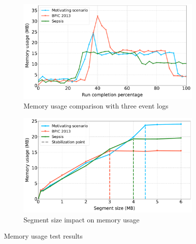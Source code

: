 \begin{figure}[t]
\begin{subfigure}{0.49\textwidth}   
  \centering      
  \includegraphics[width=\textwidth]{content/figures/memoryusage3-2.pdf}
  \caption{Memory usage comparison with three event logs}
  \label{snr_c}
\end{subfigure}
\begin{subfigure}{0.49\textwidth}   
  \centering
  \includegraphics[width=\textwidth]{content/figures/memoryusage4-2.pdf}
  \caption{Segment size impact on memory usage}
  \label{snr_d}
\end{subfigure}
\caption{Memory usage test results}
\label{fig:memtest}
\end{figure}

